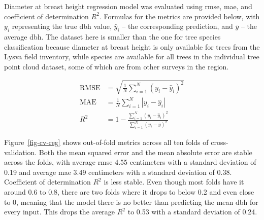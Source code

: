 Diameter at breast height regression model was evaluated using \acrfull{rmse}, \gls{mae}, and coefficient of determination $R^2$.
Formulas for the metrics are provided below, with $y_i$ representing the true \gls{dbh} value, $\hat y_i$ – the corresponding prediction, and $\overline y$ – the average \gls{dbh}.
The dataset here is smaller than the one for tree species classification because diameter at breast height is only available for trees from the Lysva field inventory, while species are available for all trees in the individual tree point cloud dataset, some of which are from other surveys in the region.

$$
\begin{aligned}
\text{RMSE} &= \sqrt{\frac{1}{N} \sum_{i=1}^N (y_i - \hat y_i)^2} \\
\text{MAE} &= \frac{1}{N} \sum_{i=1}^N | y_i - \hat y_i | \\
R^2 &= 1 - \frac{\sum_{i=1}^N (y_i - \hat y_i)^2}{\sum_{i=1}^N (y_i - \overline y)^2}
\end{aligned}
$$


Figure~\ref{fig-cv-reg} shows out-of-fold metrics across all ten folds of cross-validation.
Both the mean squared error and the mean absolute error are stable across the folds, with average \gls{rmse} 4.55 centimeters with a standard deviation of 0.19 and average \gls{mae} 3.49 centimeters with a standard deviation of 0.38.
Coefficient of determination $R^2$ is less stable.
Even though most folds have it around 0.6 to 0.8, there are two folds where it drops to below 0.2 and even close to 0, meaning that the model there is no better than predicting the mean \gls{dbh} for every input.
This drops the average $R^2$ to 0.53 with a standard deviation of 0.24.


